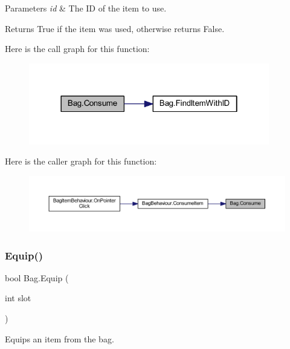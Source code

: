 \begin{DoxyParams}{Parameters}
{\em id} & The ID of the item to use.\\
\hline
\end{DoxyParams}
\begin{DoxyReturn}{Returns}
True if the item was used, otherwise returns False.
\end{DoxyReturn}
Here is the call graph for this function\+:
\nopagebreak
\begin{figure}[H]
\begin{center}
\leavevmode
\includegraphics[width=298pt]{class_bag_a85aa679243be4a24a6278d5f68c2ed5e_cgraph}
\end{center}
\end{figure}
Here is the caller graph for this function\+:
\nopagebreak
\begin{figure}[H]
\begin{center}
\leavevmode
\includegraphics[width=350pt]{class_bag_a85aa679243be4a24a6278d5f68c2ed5e_icgraph}
\end{center}
\end{figure}
\mbox{\label{class_bag_a975e4ef7a5647327225e5b587b32c066}} 
\subsubsection{\texorpdfstring{Equip()}{Equip()}}
{\footnotesize\ttfamily bool Bag.\+Equip (\begin{DoxyParamCaption}\item[{int}]{slot }\end{DoxyParamCaption})}



Equips an item from the bag. 


